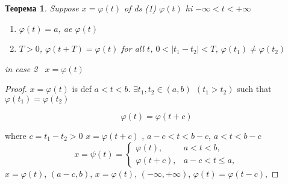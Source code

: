 \documentclass{article}
\theoremstyle{plain} \newtheorem*{theorem*}{Теорема}
\theoremstyle{plain} \newtheorem{theorem}{Теорема}[section]
\begin{document}
\begin{theorem*}
    Suppose $x = \varphi (t)$ of ds (1) $\varphi (t) $ hi $ - \infty < t < +\infty$
    \begin{enumerate}
        \item $\varphi (t) = a$, ae $\varphi (t)$
        \item $T > 0$, $\varphi (t + T) = \varphi (t)$ for all $t$, $0 < \vert t_1 - t_2 \vert < T$, $\varphi (t_1) \neq \varphi(t_2)$
    \end{enumerate}
    in case 2 \ $x = \varphi(t)$
\end{theorem*}

\begin{proof}

    $x = \varphi(t)$ is def $a < t < b$. $\exists t_1,t_2 \in (a,b) \ \ (t_1 > t_2)$ such that $\varphi(t_1) = \varphi(t_2)$

    \begin{equation}
        \varphi(t) = \varphi(t + c)
    \end{equation}

    where $c = t_1 - t_2 > 0$
    $x = \varphi(t+c)$ , $a-c < t < b-c$, $a < t < b-c$
    \begin{equation}
        x = \psi(t) =
        \begin{cases}
            \varphi(t), &a < t < b,\\
            \varphi(t + c), & a-c < t \le a,
        \end{cases}
    \end{equation}
    $x = \varphi(t)$, $(a-c, b)$, $x = \varphi(t)$,
    $(-\infty, +\infty)$,
    $\varphi(t) = \varphi(t - c)$,
\end{proof}
\end{document}
